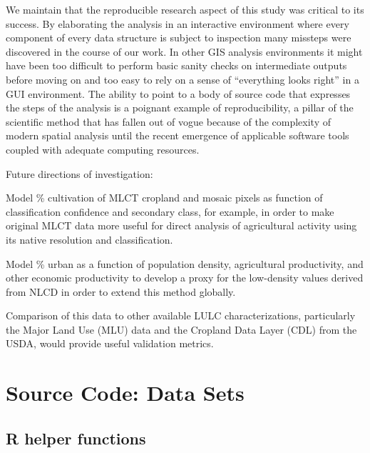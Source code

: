 \documentclass[draftthesis]{neiuthesis}
\begin{document}
We maintain that the reproducible research aspect of this study was
critical to its success.  By elaborating the analysis in an
interactive environment where every component of every data structure
is subject to inspection many missteps were discovered in the course
of our work.  In other GIS analysis environments it might have been
too difficult to perform basic sanity checks on intermediate outputs
before moving on and too easy to rely on a sense of ``everything looks
right'' in a GUI environment.  The ability to point to a body of
source code that expresses the steps of the analysis is a poignant
example of reproducibility, a pillar of the scientific method that has
fallen out of vogue because of the complexity of modern spatial
analysis until the recent emergence of applicable software tools
coupled with adequate computing resources.

Future directions of investigation:

Model \% cultivation of MLCT cropland and mosaic pixels as function of classification
confidence and secondary class, for example, in order to make original
MLCT data more useful for direct analysis of agricultural activity using
its native resolution and classification.

Model \% urban as a function of population density, agricultural
productivity, and other economic productivity to develop a proxy for
the low-density values derived from NLCD in order to extend this
method globally.

Comparison of this data to other available LULC characterizations,
particularly the Major Land Use (MLU) data and the Cropland Data Layer
(CDL) from the USDA, would provide useful validation metrics.



\backmatter




\appendix

\chapter{Source Code: Data Sets}

\section*{R helper functions}

\end{document}
